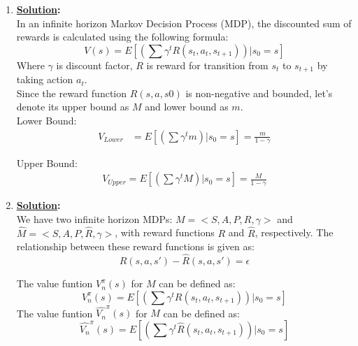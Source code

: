 \documentclass[12pt]{article}
\newcommand{\solution}{\noindent \textbf{\underline{Solution}: }}
\begin{document}
\begin{enumerate}
    \item \solution \\
    In an infinite horizon Markov Decision Process (MDP), the discounted sum of rewards is calculated using the following formula: 
    \begin{equation*}
        V(s) = E\left[ \left(\sum \gamma^t R(s_t, a_t, s_{t+1})\right) | s_0 = s \right]
    \end{equation*}
    Where $\gamma$ is discount factor, $R$ is reward for transition from $s_t$ to $s_{t+1}$ by taking action $a_t$. \\
    Since the reward function $R(s, a, s0)$ is non-negative and bounded, let's denote its upper bound as $M$ and lower bound as $m$.\\
    Lower Bound: \\
    \begin{align*}
        V_{Lower} &= E\left[ \left(\sum \gamma^t m\right) | s_0 = s \right] 
         = \frac{m}{1-\gamma}
    \end{align*}

    Upper Bound: \\
    \begin{align*}
        V_{Upper} = E\left[ \left(\sum \gamma^t M\right) | s_0 = s \right] 
        = \frac{M}{1-\gamma}
    \end{align*}

    \item \solution \\
    We have two infinite horizon MDPs: $M = < S, A, P, R, \gamma >$ and $\hat{M} = < S, A, P, \hat{R}, \gamma >$, 
    with reward functions $R$ and $\hat{R}$, respectively. The relationship between these reward functions is given as:
    \begin{equation*}
        R(s, a, s') - \hat{R}(s, a, s') = \epsilon
    \end{equation*}

    The value funtion $V_n ^\pi(s)$ for $M$ can be defined as:
    \begin{equation*}
        V_n ^\pi(s) = E\left[ \left(\sum \gamma^t R(s_t, a_t, s_{t+1})\right) | s_0 = s \right]
    \end{equation*}
    The value funtion $\hat{V_n} ^\pi(s)$ for $M$ can be defined as:
    \begin{equation*}
        \hat{V_n} ^\pi(s) = E\left[ \left(\sum \gamma^t \hat{R}(s_t, a_t, s_{t+1})\right) | s_0 = s \right]
    \end{equation*}


\end{enumerate}
\end{document}
